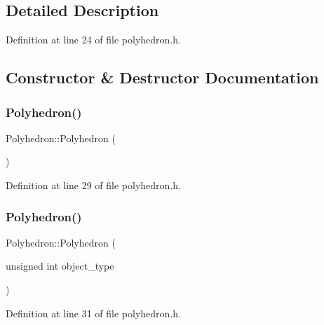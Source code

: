 \subsection{Detailed Description}


Definition at line 24 of file polyhedron.\+h.



\subsection{Constructor \& Destructor Documentation}
\mbox{\label{class_polyhedron_aebdf7ee85eb636069bf93afb4e6a483f}} 
\subsubsection{\texorpdfstring{Polyhedron()}{Polyhedron()}\hspace{0.1cm}{\footnotesize\ttfamily [1/4]}}
{\footnotesize\ttfamily Polyhedron\+::\+Polyhedron (\begin{DoxyParamCaption}{ }\end{DoxyParamCaption})\hspace{0.3cm}{\ttfamily [inline]}}



Definition at line 29 of file polyhedron.\+h.

\mbox{\label{class_polyhedron_a304950efef7fb67203d8136578b42535}} 
\subsubsection{\texorpdfstring{Polyhedron()}{Polyhedron()}\hspace{0.1cm}{\footnotesize\ttfamily [2/4]}}
{\footnotesize\ttfamily Polyhedron\+::\+Polyhedron (\begin{DoxyParamCaption}\item[{unsigned int}]{object\+\_\+type }\end{DoxyParamCaption})\hspace{0.3cm}{\ttfamily [inline]}}



Definition at line 31 of file polyhedron.\+h.


